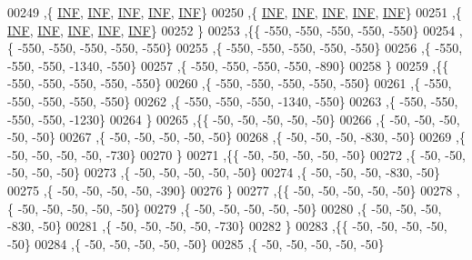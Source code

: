 \begin{DoxyCode}
00249   ,\{   \mbox{\hyperlink{1_88_84__epars_8h_a12c2040f25d8e3a7b9e1c2024c618cb6}{INF}},   \mbox{\hyperlink{1_88_84__epars_8h_a12c2040f25d8e3a7b9e1c2024c618cb6}{INF}},   \mbox{\hyperlink{1_88_84__epars_8h_a12c2040f25d8e3a7b9e1c2024c618cb6}{INF}},   \mbox{\hyperlink{1_88_84__epars_8h_a12c2040f25d8e3a7b9e1c2024c618cb6}{INF}},   \mbox{\hyperlink{1_88_84__epars_8h_a12c2040f25d8e3a7b9e1c2024c618cb6}{INF}}\}
00250   ,\{   \mbox{\hyperlink{1_88_84__epars_8h_a12c2040f25d8e3a7b9e1c2024c618cb6}{INF}},   \mbox{\hyperlink{1_88_84__epars_8h_a12c2040f25d8e3a7b9e1c2024c618cb6}{INF}},   \mbox{\hyperlink{1_88_84__epars_8h_a12c2040f25d8e3a7b9e1c2024c618cb6}{INF}},   \mbox{\hyperlink{1_88_84__epars_8h_a12c2040f25d8e3a7b9e1c2024c618cb6}{INF}},   \mbox{\hyperlink{1_88_84__epars_8h_a12c2040f25d8e3a7b9e1c2024c618cb6}{INF}}\}
00251   ,\{   \mbox{\hyperlink{1_88_84__epars_8h_a12c2040f25d8e3a7b9e1c2024c618cb6}{INF}},   \mbox{\hyperlink{1_88_84__epars_8h_a12c2040f25d8e3a7b9e1c2024c618cb6}{INF}},   \mbox{\hyperlink{1_88_84__epars_8h_a12c2040f25d8e3a7b9e1c2024c618cb6}{INF}},   \mbox{\hyperlink{1_88_84__epars_8h_a12c2040f25d8e3a7b9e1c2024c618cb6}{INF}},   \mbox{\hyperlink{1_88_84__epars_8h_a12c2040f25d8e3a7b9e1c2024c618cb6}{INF}}\}
00252   \}
00253  ,\{\{  -550,  -550,  -550,  -550,  -550\}
00254   ,\{  -550,  -550,  -550,  -550,  -550\}
00255   ,\{  -550,  -550,  -550,  -550,  -550\}
00256   ,\{  -550,  -550,  -550, -1340,  -550\}
00257   ,\{  -550,  -550,  -550,  -550,  -890\}
00258   \}
00259  ,\{\{  -550,  -550,  -550,  -550,  -550\}
00260   ,\{  -550,  -550,  -550,  -550,  -550\}
00261   ,\{  -550,  -550,  -550,  -550,  -550\}
00262   ,\{  -550,  -550,  -550, -1340,  -550\}
00263   ,\{  -550,  -550,  -550,  -550, -1230\}
00264   \}
00265  ,\{\{   -50,   -50,   -50,   -50,   -50\}
00266   ,\{   -50,   -50,   -50,   -50,   -50\}
00267   ,\{   -50,   -50,   -50,   -50,   -50\}
00268   ,\{   -50,   -50,   -50,  -830,   -50\}
00269   ,\{   -50,   -50,   -50,   -50,  -730\}
00270   \}
00271  ,\{\{   -50,   -50,   -50,   -50,   -50\}
00272   ,\{   -50,   -50,   -50,   -50,   -50\}
00273   ,\{   -50,   -50,   -50,   -50,   -50\}
00274   ,\{   -50,   -50,   -50,  -830,   -50\}
00275   ,\{   -50,   -50,   -50,   -50,  -390\}
00276   \}
00277  ,\{\{   -50,   -50,   -50,   -50,   -50\}
00278   ,\{   -50,   -50,   -50,   -50,   -50\}
00279   ,\{   -50,   -50,   -50,   -50,   -50\}
00280   ,\{   -50,   -50,   -50,  -830,   -50\}
00281   ,\{   -50,   -50,   -50,   -50,  -730\}
00282   \}
00283  ,\{\{   -50,   -50,   -50,   -50,   -50\}
00284   ,\{   -50,   -50,   -50,   -50,   -50\}
00285   ,\{   -50,   -50,   -50,   -50,   -50\}

\end{DoxyCode}
